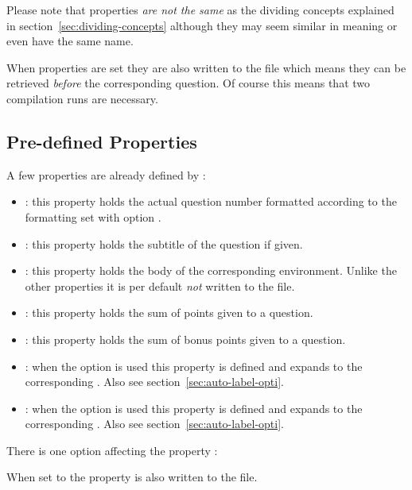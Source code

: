 \documentclass[load-preamble+,scrartcl={DIV10}]{cnltx-doc}
\begin{document}
Please note that properties \emph{are not the same} as the dividing concepts
explained in section~\ref{sec:dividing-concepts} although they may seem
similar in meaning or even have the same name.

When properties are set they are also written to the  file which
means they can be retrieved \emph{before} the corresponding question.  Of
course this means that two compilation runs are necessary.

\subsection{Pre-defined Properties}

A few properties are already defined by \ExSheets:
\begin{itemize}
  \item {}: this property holds the actual
    question number formatted according to the formatting set with option
    .
  \item {}: this property holds the subtitle
    of the question if given.
  \item {}: this property holds the body
    of the corresponding  environment.  Unlike the other
    properties it is per default \emph{not} written to the  file.
  \item {}: this property holds the sum of points given to a
    question.
  \item {}: this property holds the sum of
    bonus points given to a question.
  \item {}: when the option  is
    used this property is defined and expands to the corresponding .
    Also see section~\ref{sec:auto-label-opti}.
  \item {}: when the option
     is used this property is defined and expands to the
    corresponding .  Also see section~\ref{sec:auto-label-opti}.
\end{itemize}

There is one option affecting the property :
\begin{options}
    When set to  the property  is also written
    to the  file.
\end{options}
\end{document}
